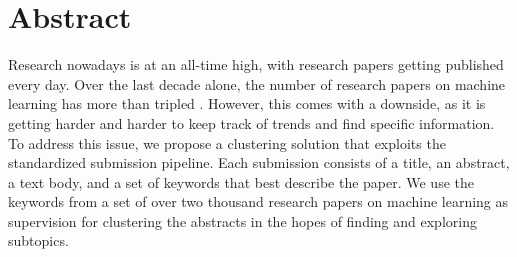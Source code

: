 \section{Abstract}
Research nowadays is at an all-time high, with research papers getting published every day.
Over the last decade alone, the number of research papers on machine learning has more than tripled \cite{dimensions}.
However, this comes with a downside, as it is getting harder and harder to keep track of trends and find specific information.
To address this issue, we propose a clustering solution that exploits the standardized submission pipeline.
Each submission consists of a title, an abstract, a text body, and a set of keywords that best describe the paper.
We use the keywords from a set of over two thousand research papers on machine learning as supervision for clustering the abstracts in the hopes of finding and exploring subtopics.